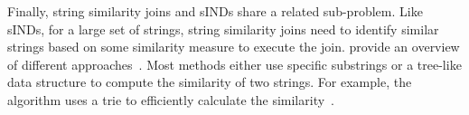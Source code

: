 %
%
Finally, string similarity joins and sINDs share a related sub-problem.
Like sINDs, for a large set of strings, string similarity joins need to identify similar strings based on some similarity measure to execute the join.
\citeauthor{StringSimSurvey} provide an overview of different approaches~\cite{StringSimSurvey}.
Most methods either use specific substrings or a tree-like data structure to compute the similarity of two strings.
For example, the algorithm  uses a trie to efficiently calculate the similarity~\cite{feng2012trie}.


